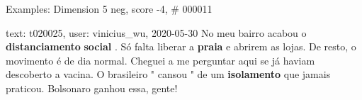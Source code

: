 \begin{frame}{Examples: Dimension 5 neg, score -4, \# 000011}
\footnotesize
\begin{alertblock}{text: t020025, user: vinicius\_wu, 2020-05-30}
No meu bairro acabou o \textbf{distanciamento} \textbf{social} . Só falta 
liberar a \textbf{praia} e abrirem as lojas. De resto, o movimento é de dia 
normal. Cheguei a me perguntar aqui se já haviam descoberto a vacina. O 
brasileiro " cansou " de um \textbf{isolamento} que jamais praticou. Bolsonaro 
ganhou essa, gente! 
\end{alertblock}
\end{frame}
